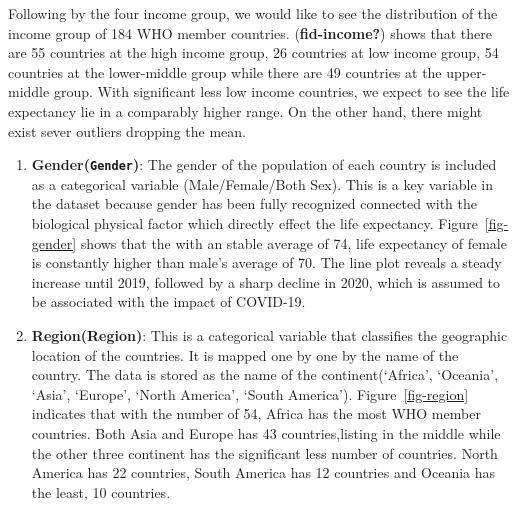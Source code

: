 \documentclass[
  letterpaper,
  DIV=11,
  numbers=noendperiod]{scrartcl}
\begin{document}
Following by the four income group, we would like to see the
distribution of the income group of 184 WHO member countries.
(\textbf{fid-income?}) shows that there are 55 countries at the high
income group, 26 countries at low income group, 54 countries at the
lower-middle group while there are 49 countries at the upper-middle
group. With significant less low income countries, we expect to see the
life expectancy lie in a comparably higher range. On the other hand,
there might exist sever outliers dropping the mean.

\begin{enumerate}
\def\labelenumi{\arabic{enumi}.}
\setcounter{enumi}{1}
\item
  \textbf{Gender(\texttt{Gender})}: The gender of the population of each
  country is included as a categorical variable (Male/Female/Both Sex).
  This is a key variable in the dataset because gender has been fully
  recognized connected with the biological physical factor which
  directly effect the life expectancy. Figure~\ref{fig-gender} shows
  that the with an stable average of 74, life expectancy of female is
  constantly higher than male's average of 70. The line plot reveals a
  steady increase until 2019, followed by a sharp decline in 2020, which
  is assumed to be associated with the impact of COVID-19.
\item
  \textbf{Region(Region)}: This is a categorical variable that
  classifies the geographic location of the countries. It is mapped one
  by one by the name of the country. The data is stored as the name of
  the continent(`Africa', `Oceania', `Asia', `Europe', `North America',
  `South America'). Figure~\ref{fig-region} indicates that with the
  number of 54, Africa has the most WHO member countries. Both Asia and
  Europe has 43 countries,listing in the middle while the other three
  continent has the significant less number of countries. North America
  has 22 countries, South America has 12 countries and Oceania has the
  least, 10 countries.
\end{enumerate}
\end{document}
